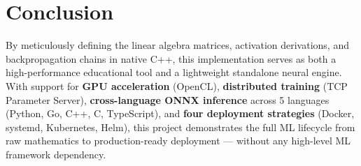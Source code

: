 \documentclass[11pt, a4paper]{article}
\begin{document}
\section{Conclusion}
By meticulously defining the linear algebra matrices, activation derivations, and backpropagation chains in native C++, this implementation serves as both a high-performance educational tool and a lightweight standalone neural engine. With support for \textbf{GPU acceleration} (OpenCL), \textbf{distributed training} (TCP Parameter Server), \textbf{cross-language ONNX inference} across 5 languages (Python, Go, C++, C, TypeScript), and \textbf{four deployment strategies} (Docker, systemd, Kubernetes, Helm), this project demonstrates the full ML lifecycle from raw mathematics to production-ready deployment --- without any high-level ML framework dependency.
\end{document}
